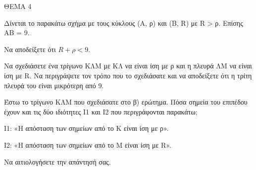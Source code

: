 
ΘΕΜΑ 4

Δίνεται το παρακάτω σχήμα με τους κύκλους (Α, ρ) και (Β, R) με R \textgreater{} ρ. Επίσης ΑΒ = 9.

\begin{alist}
\item Να αποδείξετε ότι $R + \rho < 9$. 

\item Να σχεδιάσετε ένα τρίγωνο ΚΛΜ με ΚΛ να είναι ίση με ρ και η πλευρά ΛΜ να είναι ίση με R. Να περιγράψετε τον τρόπο που το σχεδιάσατε και να αποδείξετε ότι η τρίτη πλευρά του είναι μικρότερη από 9.


\item Έστω το τρίγωνο ΚΛΜ που σχεδιάσατε στο β) ερώτημα. Πόσα σημεία του επιπέδου έχουν και τις δύο ιδιότητες Ι1 και Ι2 που περιγράφονται παρακάτω;

Ι1: «Η απόσταση των σημείων από το Κ είναι ίση με ρ».

Ι2: «Η απόσταση των σημείων από το Μ είναι ίση με R».

Να αιτιολογήσετε την απάντησή σας.



\end{alist}
